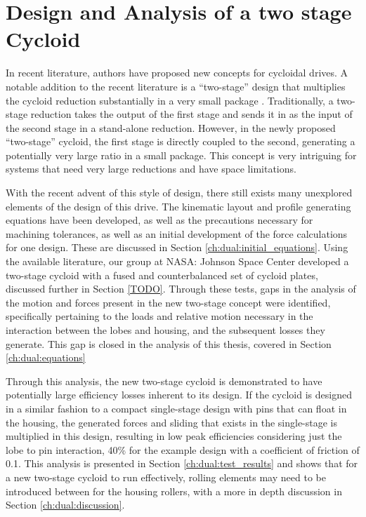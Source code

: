 
\chapter{Design and Analysis of a two stage Cycloid}\label{ch:dual}

In recent literature, authors have proposed new concepts for cycloidal drives. A notable addition to the recent literature is a ``two-stage'' design that multiplies the cycloid reduction substantially in a very small package \cite{ref:new_two_stage}. Traditionally, a two-stage reduction takes the output of the first stage and sends it in as the input of the second stage in a stand-alone reduction. However, in the newly proposed ``two-stage'' cycloid, the first stage is directly coupled to the second, generating a potentially very large ratio in a small package. This concept is very intriguing for systems that need very large reductions and have space limitations. 

With the recent advent of this style of design, there still exists many unexplored elements of the design of this drive. The kinematic layout and profile generating equations have been developed, as well as the precautions necessary for machining tolerances, as well as an initial development of the force calculations for one design. These are discussed in Section \ref{ch:dual:initial_equations}. Using the available literature, our group at NASA: Johnson Space Center developed a two-stage cycloid with a fused and counterbalanced set of cycloid plates, discussed further in Section \ref{TODO}. Through these tests, gaps in the analysis of the motion and forces present in the new two-stage concept were identified, specifically pertaining to the loads and relative motion necessary in the interaction between the lobes and housing, and the subsequent losses they generate. This gap is closed in the analysis of this thesis, covered in Section \ref{ch:dual:equations}


Through this analysis, the new two-stage cycloid is demonstrated to have potentially large efficiency losses inherent to its design. If the cycloid is designed in a similar fashion to a compact single-stage design with pins that can float in the housing, the generated forces and sliding that exists in the single-stage is multiplied in this design, resulting in low peak efficiencies considering just the lobe to pin interaction, 40\% for the example design with a coefficient of friction of 0.1. This analysis is presented in Section \ref{ch:dual:test_results} and shows that for a new two-stage cycloid to run effectively, rolling elements may need to be introduced between for the housing rollers, with a more in depth discussion in Section \ref{ch:dual:discussion}.


